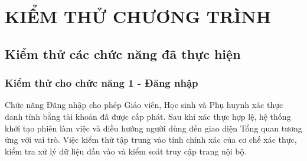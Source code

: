 
\chapter{KIỂM THỬ CHƯƠNG TRÌNH}

\setlength{\tabcolsep}{4.5pt}
\renewcommand{\arraystretch}{1.2}

\section{Kiểm thử các chức năng đã thực hiện}
\subsection{Kiểm thử cho chức năng 1 - Đăng nhập}

\hspace*{1em}Chức năng Đăng nhập cho phép Giáo viên, Học sinh và Phụ huynh xác thực danh tính bằng tài khoản đã được cấp phát. Sau khi xác thực hợp lệ, hệ thống khởi tạo phiên làm việc và điều hướng người dùng đến giao diện Tổng quan tương ứng với vai trò. Việc kiểm thử tập trung vào tính chính xác của cơ chế xác thực, kiểm tra xử lý dữ liệu đầu vào và kiểm soát truy cập trang nội bộ.

